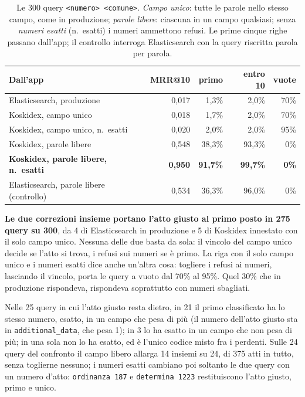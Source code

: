 \begin{table}[ht]
  \centering
  \small
  \begin{tabular}{lrrrr}
    \toprule
    Dall'app & MRR@10 & primo & entro 10 & vuote \\
    \midrule
    Elasticsearch, produzione & 0,017 & 1,3\% & 2,0\% & 70\% \\
    Koskidex, campo unico & 0,018 & 1,7\% & 2,0\% & 70\% \\
    Koskidex, campo unico, n.\ esatti & 0,020 & 2,0\% & 2,0\% & 95\% \\
    Koskidex, parole libere & 0,548 & 38,3\% & 93,3\% & 0\% \\
    \textbf{Koskidex, parole libere, n.\ esatti} & \textbf{0,950} & \textbf{91,7\%} & \textbf{99,7\%} & \textbf{0\%} \\
    \midrule
    Elasticsearch, parole libere (controllo) & 0,534 & 36,3\% & 96,0\% & 0\% \\
    \bottomrule
  \end{tabular}
  \caption{Le 300 query \texttt{<numero> <comune>}. \emph{Campo unico}: tutte le
  parole nello stesso campo, come in produzione; \emph{parole libere}: ciascuna in
  un campo qualsiasi; senza \emph{numeri esatti} (n.\ esatti) i numeri ammettono refusi. Le
  prime cinque righe passano dall'app; il controllo interroga Elasticsearch con la
  query riscritta parola per parola.}
  \label{tab:numero-comune}
\end{table}

\textbf{Le due correzioni insieme portano l'atto giusto al primo posto in 275
query su 300}, da 4 di Elasticsearch in produzione e 5 di Koskidex innestato
con il solo campo unico. Nessuna delle due basta da sola: il vincolo del campo unico
decide se l'atto si trova, i refusi sui numeri se è primo. La riga con il solo
campo unico e i numeri esatti dice anche un'altra cosa: togliere i refusi ai
numeri, lasciando il vincolo, porta le query a vuoto dal 70\% al 95\%. Quel 30\%
che in produzione rispondeva, rispondeva soprattutto con numeri sbagliati.

Nelle 25 query in cui l'atto giusto resta dietro, in 21 il primo classificato ha
lo stesso numero, esatto, in un campo che pesa di più (il numero dell'atto giusto
sta in \texttt{additional\_data}, che pesa 1); in 3 lo ha esatto in un campo che
non pesa di più; in una sola non lo ha esatto, ed è l'unico codice misto fra i
perdenti. Sulle 24 query del confronto il campo libero allarga 14 insiemi su 24,
di 375 atti in tutto, senza toglierne nessuno; i numeri esatti cambiano poi
soltanto le due query con un numero d'atto: \texttt{ordinanza 187} e
\texttt{determina 1223} restituiscono l'atto giusto, primo e unico.

